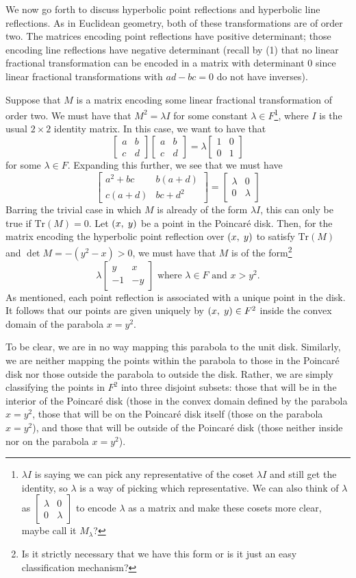 \documentclass[12pt]{article}
\newcommand{\poincare}{Poincar\'{e} }
\newcommand{\Tr}{\text{Tr}}
\newcommand{\ttc}{, \hspace{1mm}}
\newcommand{\lftmat}[4]{\begin{bmatrix} {#1} & {#2} \\ {#3} & {#4} \end{bmatrix}}
\newcommand{\stanlftmat}{\lftmat{a}{b}{c}{d}}
\newcommand{\pointmat}[2]{\lftmat{{#2}}{{#1}}{-1}{-{#2}}}
\newcommand{\stanpointmat}{\pointmat{x}{y}}
\theoremstyle{plain}
\theoremstyle{definition}
\begin{document}
\[\]


We now go forth to discuss hyperbolic point reflections and hyperbolic line reflections. As in Euclidean geometry, both of these transformations are of order two. The matrices encoding point reflections have positive determinant; those encoding line reflections have negative determinant (recall by (1) that no linear fractional transformation can be encoded in a matrix with determinant 0 since linear fractional transformations with $ad - bc = 0$ do not have inverses). 

Suppose that $M$ is a matrix encoding some linear fractional transformation of order two. We must have that $M^2 = \lambda I$ for some constant $\lambda \in F$\footnote{$\lambda I$ is saying we can pick any representative of the coset $\lambda I$ and still get the identity, so $\lambda$ is a way of picking which representative. We can also think of $\lambda$ as $\lftmat{\lambda}{0}{0}{\lambda}$ to encode $\lambda$ as a matrix and make these cosets more clear, maybe call it $M_\lambda$?}, where $I$ is the usual $2 \times 2$ identity matrix. In this case, we want to have that 
	\[
		\stanlftmat \stanlftmat = \lambda \lftmat{1}{0}{0}{1}
	\]
for some $\lambda \in F$. Expanding this further, we see that we must have 
	\[
		\lftmat{a^2 + bc}{b(a+d)}{c(a+d)}{bc+d^2} =  \lftmat{\lambda}{0}{0}{\lambda}
	\]
Barring the trivial case in which $M$ is already of the form $\lambda I$, this can only be true if $\Tr(M) = 0$. Let $(x \ttc y)$ be a point in the \poincare disk. Then, for the matrix encoding the hyperbolic point reflection over $(x \ttc y)$ to satisfy $\Tr(M)$ and $\det M = -(y^2 - x) > 0$, we must have that $M$ is of the form\footnote{Is it strictly necessary that we have this form or is it just an easy classification mechanism?} 
\begin{equation} 
	\lambda \stanpointmat \text{ where } \lambda \in F \text{ and } x > y^2. 
\end{equation}	
As mentioned, each point reflection is associated with a unique point in the disk. It follows that our points are given uniquely by $(x \ttc y) \in F^2$ inside the convex domain of the parabola $x = y^2$.

To be clear, we are in no way mapping this parabola to the unit disk. Similarly, we are neither mapping the points within the parabola to those in the \poincare disk nor those outside the parabola to outside the disk. Rather, we are simply classifying the points in $F^2$ into three disjoint subsets: those that will be in the interior of the \poincare disk (those in the convex domain defined by the parabola $x = y^2$, those that will be on the \poincare disk itself (those on the parabola $x = y^2$), and those that will be outside of the \poincare disk (those neither inside nor on the parabola $x = y^2$). 
\end{document}
